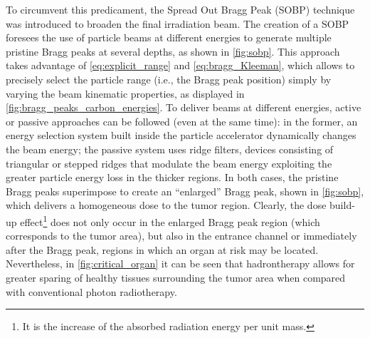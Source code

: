 To circumvent this predicament, the Spread Out Bragg Peak (SOBP) technique was introduced to broaden the final irradiation beam. The creation of a SOBP foresees the use of particle beams at different energies to generate multiple pristine Bragg peaks at several depths, as shown in \autoref{fig:sobp}. This approach takes advantage of \autoref{eq:explicit_range} and \autoref{eq:bragg_Kleeman}, which allows to precisely select the particle range (i.e., the Bragg peak position) simply by varying the beam kinematic properties, as displayed in \autoref{fig:bragg_peaks_carbon_energies}. To deliver beams at different energies, active or passive approaches can be followed (even at the same time): in the former, an energy selection system built inside the particle accelerator dynamically changes the beam energy; the passive system uses ridge filters, devices consisting of triangular or stepped ridges that modulate the beam energy exploiting the greater particle energy loss in the thicker regions. In both cases, the pristine Bragg peaks superimpose to create an ``enlarged'' Bragg peak, shown in \autoref{fig:sobp}, which delivers a homogeneous dose to the tumor region. Clearly, the dose build-up effect\footnote{It is the increase of the absorbed radiation energy per unit mass.} does not only occur in the enlarged Bragg peak region (which corresponds to the tumor area), but also in the entrance channel or immediately after the Bragg peak, regions in which an organ at risk may be located. Nevertheless, in \autoref{fig:critical_organ} it can be seen that hadrontherapy allows for greater sparing of healthy tissues surrounding the tumor area when compared with conventional photon radiotherapy.

